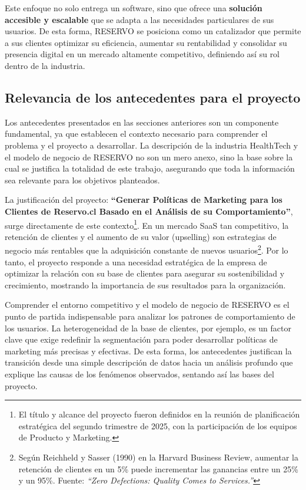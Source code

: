 Este enfoque no solo entrega un software, sino que ofrece una \textbf{solución accesible y escalable} que se adapta a las necesidades particulares de sus usuarios. De esta forma, RESERVO se posiciona como un catalizador que permite a sus clientes optimizar su eficiencia, aumentar su rentabilidad y consolidar su presencia digital en un mercado altamente competitivo, definiendo así su rol dentro de la industria.

\subsection{Relevancia de los antecedentes para el proyecto}

Los antecedentes presentados en las secciones anteriores son un componente fundamental, ya que establecen el contexto necesario para comprender el problema y el proyecto a desarrollar. La descripción de la industria HealthTech y el modelo de negocio de RESERVO no son un mero anexo, sino la base sobre la cual se justifica la totalidad de este trabajo, asegurando que toda la información sea relevante para los objetivos planteados.

La justificación del proyecto: \textbf{“Generar Políticas de Marketing para los Clientes de Reservo.cl Basado en el Análisis de su Comportamiento”}, surge directamente de este contexto\footnote{El título y alcance del proyecto fueron definidos en la reunión de planificación estratégica del segundo trimestre de 2025, con la participación de los equipos de Producto y Marketing.}. En un mercado SaaS tan competitivo, la retención de clientes y el aumento de su valor (upselling) son estrategias de negocio más rentables que la adquisición constante de nuevos usuarios\footnote{Según Reichheld y Sasser (1990) en la Harvard Business Review, aumentar la retención de clientes en un 5\% puede incrementar las ganancias entre un 25\% y un 95\%. Fuente: \textit{“Zero Defections: Quality Comes to Services.”}}. Por lo tanto, el proyecto responde a una necesidad estratégica de la empresa de optimizar la relación con su base de clientes para asegurar su sostenibilidad y crecimiento, mostrando la importancia de sus resultados para la organización.

Comprender el entorno competitivo y el modelo de negocio de RESERVO es el punto de partida indispensable para analizar los patrones de comportamiento de los usuarios. La heterogeneidad de la base de clientes, por ejemplo, es un factor clave que exige redefinir la segmentación para poder desarrollar políticas de marketing más precisas y efectivas. De esta forma, los antecedentes justifican la transición desde una simple descripción de datos hacia un análisis profundo que explique las causas de los fenómenos observados, sentando así las bases del proyecto.

